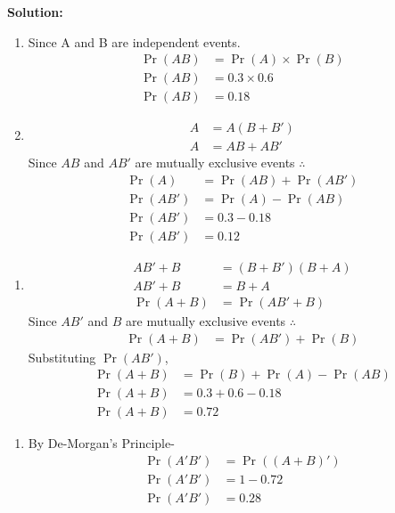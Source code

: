 \documentclass{beamer}
\newcounter{saveenumerate}
\newcommand{\saveenumerate}{\setcounter{saveenumerate}{\value{enumi}}}
\newcommand{\restartenumerate}{\setcounter{enumi}{\value{saveenumerate}}}
\providecommand{\pr}[1]{\ensuremath{\Pr\left(#1\right)}}
\begin{document}
\begin{frame}
\textbf{Solution:} 
\begin{enumerate}[i]
\item Since A and B are independent events.
		\begin{align}
		\pr{AB}&=\pr{A}\times\pr{B}\\
			\pr{AB}&=0.3\times0.6\\
			\pr{AB}&=0.18
			\end{align}
\item  %
			\begin{align}
			A&=A(B+B')\\
			A&=AB+AB'
			\end{align}
			Since $AB$ and $AB'$ are mutually exclusive events $\therefore$
			\begin{align}
			\pr{A}&=\pr{AB}+\pr{AB'}\\
			\pr{AB'}&=\pr{A}-\pr{AB}\\
			\pr{AB'}&=0.3-0.18\\
			\pr{AB'}&=0.12
			\end{align}
			\saveenumerate
			\end{enumerate}
			\end{frame}
			\begin{frame}
			\begin{enumerate}[i]
			\restartenumerate
\item  \begin{align}
			AB'+B&=(B+B')(B+A)\\
			AB'+B&=B+A\\
			\pr{A+B}&=\pr{AB'+B}
			\end{align}
			Since $AB'$ and $B$ are mutually exclusive events $\therefore$
			\begin{align}
			\pr{A+B}&=\pr{AB'}+\pr{B}
			\end{align}
			Substituting $\pr{AB'}$,
			\begin{align}
			\pr{A+B}&=\pr{B}+\pr{A}-\pr{AB}\\
			\pr{A+B}&=0.3+0.6-0.18\\
			\pr{A+ B}&=0.72
			\end{align}
			\saveenumerate
			\end{enumerate}
			\end{frame}
			\begin{frame}
			\begin{enumerate}[i]
			\restartenumerate
\item  By De-Morgan's Principle-
			\begin{align}
			\pr{A'B'}&=\pr{(A+B)'}\\
			\pr{A'B'}&=1-0.72\\
			\pr{A'B'}&=0.28
			\end{align}		
\end{enumerate}
\end{frame}
\end{document}
